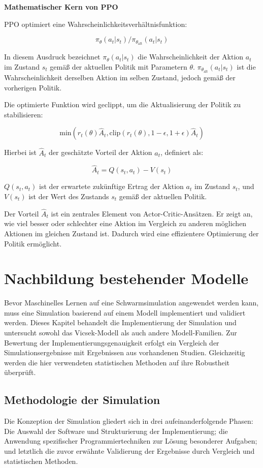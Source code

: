 \documentclass{solutionclass}
\begin{document}
\newpage

\textbf{Mathematischer Kern von PPO}

PPO optimiert eine Wahrscheinlichkeitsverhältnisfunktion:

$$\pi_{\theta}(a_t|s_t) / \pi_{\theta_{\text{alt}}}(a_t|s_t)$$

In diesem Ausdruck bezeichnet \( \pi_{\theta}(a_t|s_t) \) die Wahrscheinlichkeit der Aktion \(a_t\) im Zustand \(s_t\) gemäß der aktuellen Politik mit Parametern \(\theta\). \( \pi_{\theta_{\text{alt}}}(a_t|s_t) \) ist die Wahrscheinlichkeit derselben Aktion im selben Zustand, jedoch gemäß der vorherigen Politik.

Die optimierte Funktion wird geclippt, um die Aktualisierung der Politik zu stabilisieren:

\[
\text{min} \left( r_t(\theta) \hat{A}_t, \text{clip}(r_t(\theta), 1 - \epsilon, 1 + \epsilon) \hat{A}_t \right)
\]

Hierbei ist \( \hat{A}_t \) der geschätzte Vorteil der Aktion \( a_t \), definiert als:

\[
\hat{A}_t = Q(s_t, a_t) - V(s_t)
\]

\( Q(s_t, a_t) \) ist der erwartete zukünftige Ertrag der Aktion \( a_t \) im Zustand \( s_t \), und \( V(s_t) \) ist der Wert des Zustands \( s_t \) gemäß der aktuellen Politik.

Der Vorteil \( \hat{A}_t \) ist ein zentrales Element von Actor-Critic-Ansätzen. Er zeigt an, wie viel besser oder schlechter eine Aktion im Vergleich zu anderen möglichen Aktionen im gleichen Zustand ist. Dadurch wird eine effizientere Optimierung der Politik ermöglicht.

\newpage
\section{Nachbildung bestehender Modelle}
\label{sec:Nachbildung}
Bevor Maschinelles Lernen auf eine Schwarmsimulation angewendet werden kann, muss eine Simulation basierend auf einem Modell implementiert und validiert werden. Dieses Kapitel behandelt die Implementierung der Simulation und untersucht sowohl das Vicsek-Modell als auch andere Modell-Familien. Zur Bewertung der Implementierungsgenauigkeit erfolgt ein Vergleich der Simulationsergebnisse mit Ergebnissen aus vorhandenen Studien. Gleichzeitig werden die hier verwendeten statistischen Methoden auf ihre Robustheit überprüft.

\subsection{Methodologie der Simulation}
Die Konzeption der Simulation gliedert sich in drei aufeinanderfolgende Phasen: Die Auswahl der Software und Strukturierung der Implementierung; die Anwendung spezifischer Programmiertechniken zur Lösung besonderer Aufgaben; und letztlich die zuvor erwähnte Validierung der Ergebnisse durch Vergleich und statistischen Methoden.\\
\end{document}
